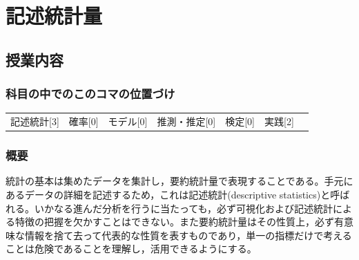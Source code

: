 \section{記述統計量}
\label{s05_descriptives}

\subsection{授業内容}
\subsubsection{科目の中でのこのコマの位置づけ}

\begin{tabular}[t]{ccccccc}
	記述統計[3] & 確率[0] & モデル[0] & 推測・推定[0] & 検定[0] & 実践[2]
\end{tabular}


\subsubsection{概要}
統計の基本は集めたデータを集計し，要約統計量で表現することである。手元にあるデータの詳細を記述するため，これは記述統計(descriptive statistics)と呼ばれる。いかなる進んだ分析を行うに当たっても，必ず可視化および記述統計による特徴の把握を欠かすことはできない。また要約統計量はその性質上，必ず有意味な情報を捨て去って代表的な性質を表すものであり，単一の指標だけで考えることは危険であることを理解し，活用できるようにする。
